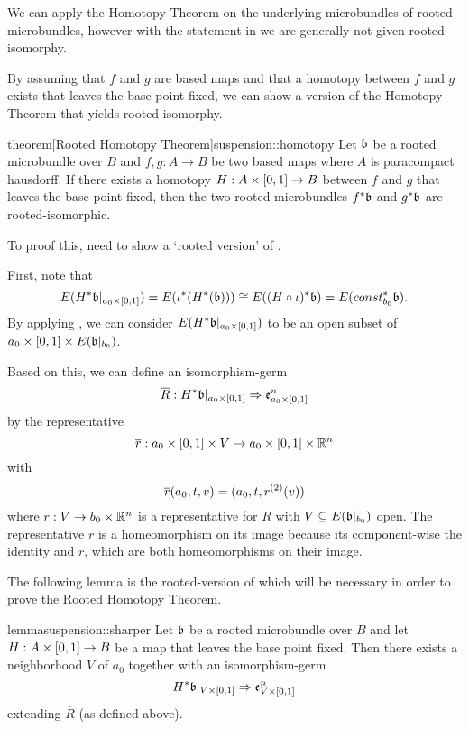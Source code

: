 \begin{myparagraph}
    We can apply the Homotopy Theorem on the underlying microbundles of
    rooted-microbundles, however with the statement in 
    we are generally not given rooted-isomorphy.

    By assuming that $f$ and $g$ are based maps and that a homotopy
    between $f$ and $g$ exists that leaves the base point fixed,
    we can show a version of the Homotopy Theorem that yields rooted-isomorphy.
\end{myparagraph}

\begin{mystatement}{theorem}[Rooted Homotopy Theorem]{suspension::homotopy}
    Let $\bb$ be a rooted microbundle over $B$ and $f, g: A \to B$ be two based maps
    where $A$ is paracompact hausdorff.
    If there exists a homotopy $H: A \times{} [0, 1] \to B$ between $f$ and $g$ that leaves the base point fixed,
    then the two rooted microbundles $\ind{f}\bb$ and $\ind{g}\bb$ are rooted-isomorphic.
\end{mystatement}

\begin{myparagraph}
    To proof this, need to show a `rooted version' of .
    
    First, note that 
    \[
        E(\ind{H}\bb[\cyl{a_0}]) = E(\ind{\iota}(\ind{H}(\bb)))
        \cong E(\ind{(H \circ \iota)}\bb) = E(\ind{const_{b_0}}\bb).
    \]
    By applying , we can consider $E(\ind{H}\bb[\cyl{a_0}])$
    to be an open subset of $a_0 \cross [0, 1] \cross E(\bbb)$.

    Based on this, we can define an isomorphism-germ
    \[ \germdef{\overline{R}}{\ind{H}\bb[\cyl{a_0}]}{\be{\cyl{a_0}}} \]
    by the representative
    \[ \overline{r}: a_0 \times{} [0, 1] \times V \to a_0 \times{} [0, 1] \times \mathbb{R}^n \]
    with
    \[ \overline{r}(a_0, t, v) = (a_0, t, r^{(2)}(v) )\]
    where $r: V \to b_0 \times \mathbb{R}^n$ is a representative for $R$ with $V \sub E(\bbb)$ open.
    The representative $\overline{r}$ is a homeomorphism on its image
    because its component-wise the identity and $r$, which are both homeomorphisms on their image. 

    The following lemma is the rooted-version of 
    which will be necessary in order to prove the Rooted Homotopy Theorem.
\end{myparagraph}

\begin{mystatement}{lemma}{suspension::sharper}
    Let $\bb$ be a rooted microbundle over $B$ and
    let $H: A \times{} [0, 1] \to B$ be a map that leaves the base point fixed.
    Then there exists a neighborhood $V$ of $a_0$ together with an isomorphism-germ
    \[ \germ{\ind{H}\bb[\cyl{V}]}{\be{\cyl{V}}} \]
    extending $\overline{R}$ (as defined above).
\end{mystatement}


